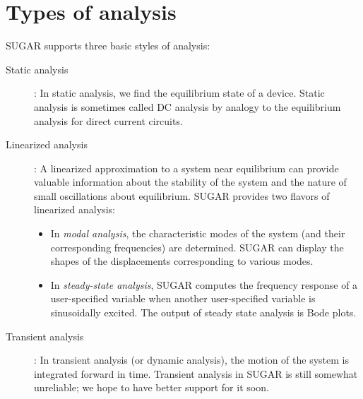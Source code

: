 

\section{Types of analysis}

SUGAR supports three basic styles of analysis:
\begin{description}
\item[Static analysis]:
  In static analysis, we find the equilibrium state of a device.
Static analysis is sometimes called DC analysis by analogy to
the equilibrium analysis for direct current circuits.

\item[Linearized analysis]:
  A linearized approximation to a system near equilibrium can
provide valuable information about the stability of the system
and the nature of small oscillations about equilibrium.  SUGAR
provides two flavors of linearized analysis:
\begin{itemize}
\item In \emph{modal analysis}, the characteristic modes of the
      system (and their corresponding frequencies) are determined.
      SUGAR can display the shapes of the displacements corresponding
      to various modes.
\item In \emph{steady-state analysis}, SUGAR computes the frequency 
      response of a user-specified variable when another user-specified
      variable is sinusoidally excited.  The output of steady
      state analysis is Bode plots.
\end{itemize}

\item[Transient analysis]:
  In transient analysis (or dynamic analysis), the motion of the system
is integrated forward in time.  Transient analysis in SUGAR is still
somewhat unreliable; we hope to have better support for it soon.

\end{description}


